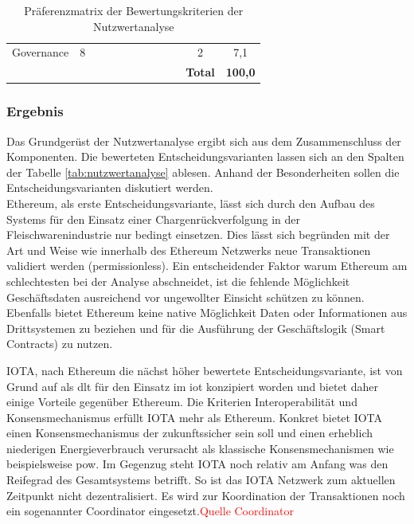 \begin{table}[H]
{\begin{tabular}{@{}lccccccccccc@{}}
		Governance               & 8            & {\cellcolor{gray!25} } & {\cellcolor{gray!25} }  & {\cellcolor{gray!25} } & {\cellcolor{gray!25} } & {\cellcolor{gray!25} } & {\cellcolor{gray!25} } & {\cellcolor{gray!25} } & {\cellcolor{gray!25} } & 2               & 7,1                 \\ \addlinespace
		\midrule
		&              &                         &                          &                         &                         &                         &                         &                         &                         & \textbf{Total}  & \textbf{100,0}      \\
		\bottomrule
	\end{tabular}%
	}
	\caption{Präferenzmatrix der Bewertungskriterien der Nutzwertanalyse}
	\label{tab:preferencematrix}
\end{table}

\subsubsection{Ergebnis}
Das Grundgerüst der Nutzwertanalyse ergibt sich aus dem Zusammenschluss der Komponenten. Die bewerteten Entscheidungsvarianten lassen sich an den Spalten der Tabelle \ref{tab:nutzwertanalyse} ablesen. Anhand der Besonderheiten sollen die Entscheidungsvarianten diskutiert werden.\\

Ethereum, als erste Entscheidungsvariante, lässt sich durch den Aufbau des Systems für den Einsatz einer Chargenrückverfolgung in der Fleischwarenindustrie nur bedingt einsetzen. Dies lässt sich begründen mit der Art und Weise wie innerhalb des Ethereum Netzwerks neue Transaktionen validiert werden (permissionless). Ein entscheidender Faktor warum Ethereum am schlechtesten bei der Analyse abschneidet, ist die fehlende Möglichkeit Geschäftsdaten ausreichend vor ungewollter Einsicht schützen zu können. Ebenfalls bietet Ethereum keine native Möglichkeit Daten oder Informationen aus Drittsystemen zu beziehen und für die Ausführung der Geschäftslogik (Smart Contracts) zu nutzen.

IOTA, nach Ethereum die nächst höher bewertete Entscheidungsvariante, ist von Grund auf als \ac{dlt} für den Einsatz im \acf{iot} konzipiert worden und bietet daher einige Vorteile gegenüber Ethereum. Die Kriterien Interoperabilität und Konsensmechanismus erfüllt IOTA mehr als Ethereum. Konkret bietet IOTA einen Konsensmechanismus der zukunftssicher sein soll und einen erheblich niederigen Energieverbrauch verursacht als klassische Konsensmechanismen wie beispielsweise \ac{pow}. Im Gegenzug steht IOTA noch relativ am Anfang was den Reifegrad des Gesamtsystems betrifft. So ist das IOTA Netzwerk zum aktuellen Zeitpunkt nicht dezentralisiert. Es wird zur Koordination der Transaktionen noch ein sogenannter \glqq Coordinator\grqq{} eingesetzt.\textcolor{red}{Quelle Coordinator}

